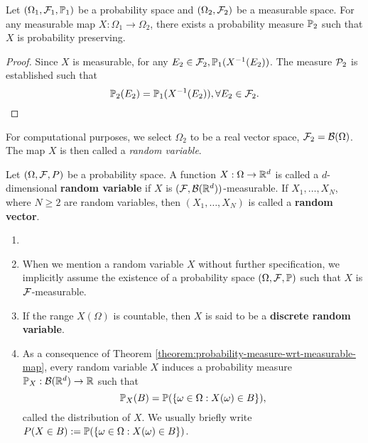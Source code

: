 \begin{theorem}
 \label{theorem:probability-measure-wrt-measurable-map}
 Let $(\Omega_1, \F_1, \PP_1)$ be a probability space and $(\Omega_2, \F_2)$ be a measurable space. For any measurable map $X : \Omega_1 \to \Omega_2$, there exists a probability measure $\PP_2$ such that $X$ is probability preserving.
\end{theorem}

\begin{proof}
 Since $X$ is measurable, for any $E_2 \in \F_2, \PP_1(X^{-1}(E_2))$. The measure $\P_2$ is established such that
 $$\PP_2(E_2) = \PP_1(X^{-1}(E_2)), \forall E_2 \in \F_2.$$
\end{proof}

For computational purposes, we select $\Omega_2$ to be a real vector space, $\F_2 = \B(\Omega)$. The map $X$ is then called a \textit{random variable}.

\begin{definition}
 \label{definition:random-variable}
 Let $(\Omega, \F, P)$ be a probability space. A function $X:\Omega\to\RR^d$ is called a $d$-dimensional \textbf{random variable} if $X$ is $(\F,\B(\RR^d))$-measurable. If $X_1,\ldots, X_N$, where $N\ge 2$ are random variables, then $(X_1,\ldots,X_N)$ is called a \textbf{random vector}.
\end{definition}


\begin{remark}
 \begin{enumerate}[label = (\roman*)]
  \item []
  \item When we mention a random variable $X$ without further specification, we implicitly assume the existence of a probability space $(\Omega, \F, \PP)$ such that $X$ is $\F$-measurable.
  \item If the range $X(\Omega)$ is countable, then $X$ is said to be a \textbf{discrete random variable}.
  \item As a consequence of Theorem \ref{theorem:probability-measure-wrt-measurable-map}, every random variable $X$ induces a probability measure $\PP_X: \B(\RR^d)\to\RR$ such that
        \begin{equation}
         \PP_X(B) = \PP(\{\omega\in\Omega : X(\omega)\in B\}),
        \end{equation}
        called the distribution of $X$. We usually briefly write $P(X\in B):= \PP(\{\omega\in\Omega : X(\omega)\in B\})$.
 \end{enumerate}
\end{remark}

